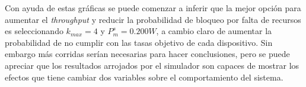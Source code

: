 Con ayuda de estas gráficas se puede comenzar a inferir que la mejor opción para aumentar el \textit{throughput} y reducir la probabilidad de bloqueo por falta de recursos es seleccionando $k_{max}=4$ y $P_{m}^{s}=0.200W$, a cambio claro de aumentar la probabilidad de no cumplir con las tasas objetivo de cada dispositivo. Sin embargo más corridas serían necesarias para hacer conclusiones, pero se puede apreciar que los resultados arrojados por el simulador son capaces de mostrar los efectos que tiene cambiar dos variables sobre el comportamiento del sistema.\newline